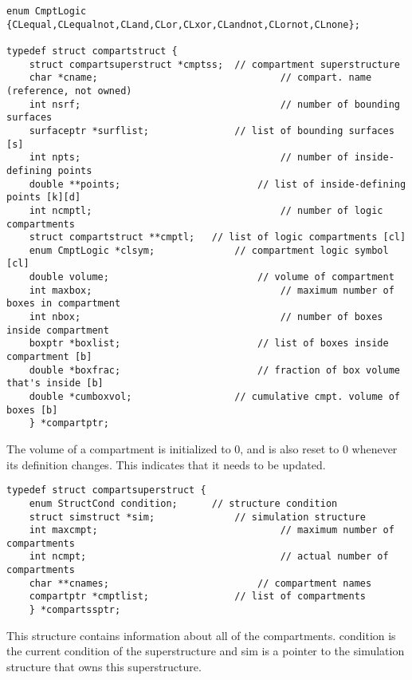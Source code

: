 \documentclass {book}
\begin{document}
\begin{lstlisting}
enum CmptLogic {CLequal,CLequalnot,CLand,CLor,CLxor,CLandnot,CLornot,CLnone};

typedef struct compartstruct {
	struct compartsuperstruct *cmptss;	// compartment superstructure
	char *cname;								// compart. name (reference, not owned)
	int nsrf;									// number of bounding surfaces
	surfaceptr *surflist;				// list of bounding surfaces [s]
	int npts;									// number of inside-defining points
	double **points;						// list of inside-defining points [k][d]
	int ncmptl;									// number of logic compartments
	struct compartstruct **cmptl;	// list of logic compartments [cl]
	enum CmptLogic *clsym;				// compartment logic symbol [cl]
	double volume;							// volume of compartment
	int maxbox;									// maximum number of boxes in compartment
	int nbox;									// number of boxes inside compartment
	boxptr *boxlist;						// list of boxes inside compartment [b]
	double *boxfrac;						// fraction of box volume that's inside [b]
	double *cumboxvol;					// cumulative cmpt. volume of boxes [b]
	} *compartptr;
\end{lstlisting}

The volume of a compartment is initialized to 0, and is also reset to 0 whenever its definition changes. This indicates that it needs to be updated.

\begin{lstlisting}
typedef struct compartsuperstruct {
	enum StructCond condition;		// structure condition
	struct simstruct *sim;				// simulation structure
	int maxcmpt;								// maximum number of compartments
	int ncmpt;									// actual number of compartments
	char **cnames;							// compartment names
	compartptr *cmptlist;				// list of compartments
	} *compartssptr;
\end{lstlisting}

This structure contains information about all of the compartments. condition is the current condition of the superstructure and sim is a pointer to the simulation structure that owns this superstructure.
\end{document}
